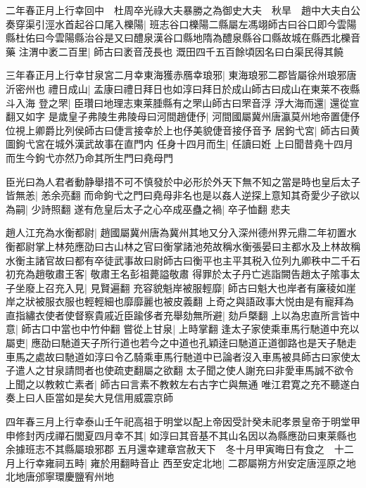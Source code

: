 二年春正月上行幸回中　杜周卒光祿大夫暴勝之為御史大夫　秋旱　趙中大夫白公奏穿渠引涇水首起谷口尾入櫟陽|{
	班志谷口櫟陽二縣屬左馮翊師古曰谷口即今雲陽縣杜佑曰今雲陽縣治谷是又曰醴泉漢谷口縣地隋為醴泉縣谷口縣故城在縣西北櫟音藥}
注渭中袤二百里|{
	師古曰袤音茂長也}
溉田四千五百餘頃因名曰白渠民得其饒

三年春正月上行幸甘泉宮二月幸東海獲赤鴈幸琅邪|{
	東海琅邪二郡皆屬徐州琅邪唐沂密州也}
禮日成山|{
	孟康曰禮日拜日也如淳曰拜日於成山師古曰成山在東莱不夜縣斗入海}
登之罘|{
	臣瓚曰地理志東莱腄縣有之罘山師古曰罘音浮}
浮大海而還|{
	還從宣翻又如字}
是歲皇子弗陵生弗陵母曰河間趙倢伃|{
	河間國屬冀州唐瀛莫州地帝置倢伃位視上卿爵比列侯師古曰倢言接幸於上也伃美貌倢音接伃音予}
居鉤弋宮|{
	師古曰黄圖鉤弋宮在城外漢武故事在直門内}
任身十四月而生|{
	任讀曰姙}
上曰聞昔堯十四月而生今鉤弋亦然乃命其所生門曰堯母門

臣光曰為人君者動静舉措不可不慎發於中必形於外天下無不知之當是時也皇后太子皆無恙|{
	恙余亮翻}
而命鉤弋之門曰堯母非名也是以姦人逆探上意知其奇愛少子欲以為嗣|{
	少詩照翻}
遂有危皇后太子之心卒成巫蠱之禍|{
	卒子恤翻}
悲夫

趙人江充為水衡都尉|{
	趙國屬冀州唐為冀州其地又分入深州德州界元鼎二年初置水衡都尉掌上林苑應劭曰古山林之官曰衡掌諸池苑故稱水衡張晏曰主都水及上林故稱水衡主諸官故曰都有卒徒武事故曰尉師古曰衡平也主平其税入位列九卿秩中二千石}
初充為趙敬肅王客|{
	敬肅王名彭祖薨謚敬肅}
得罪於太子丹亡逃詣闕告趙太子隂事太子坐廢上召充入見|{
	見賢遍翻}
充容貌魁岸被服輕靡|{
	師古曰魁大也岸者有廉稜如崖岸之狀被服衣服也輕輕細也靡靡麗也被皮義翻}
上奇之與語政事大悦由是有寵拜為直指繡衣使者使督察貴戚近臣踰侈者充舉劾無所避|{
	劾戶槩翻}
上以為忠直所言皆中意|{
	師古口中當也中竹仲翻}
嘗從上甘泉|{
	上時掌翻}
逢太子家使乘車馬行馳道中充以屬吏|{
	應劭曰馳道天子所行道也若今之中道也孔穎逹曰馳道正道御路也是天子馳走車馬之處故曰馳道如淳曰令乙騎乘車馬行馳道中已論者沒入車馬被具師古曰家使太子遣人之甘泉請問者也使疏吏翻屬之欲翻}
太子聞之使人謝充曰非愛車馬誠不欲令上聞之以教敕亡素者|{
	師古曰言素不教敕左右古字亡與無通}
唯江君寛之充不聽遂白奏上曰人臣當如是矣大見信用威震京師

四年春三月上行幸泰山壬午祀高祖于明堂以配上帝因受計癸未祀孝景皇帝于明堂甲申修封丙戌禪石閭夏四月幸不其|{
	如淳曰其音基不其山名因以為縣應劭曰東莱縣也余據班志不其縣屬琅邪郡}
五月還幸建章宫赦天下　冬十月甲寅晦日有食之　十二月上行幸雍祠五畤|{
	雍於用翻畤音止}
西至安定北地|{
	二郡屬朔方州安定唐涇原之地北地唐邠寧環慶鹽宥州地}


